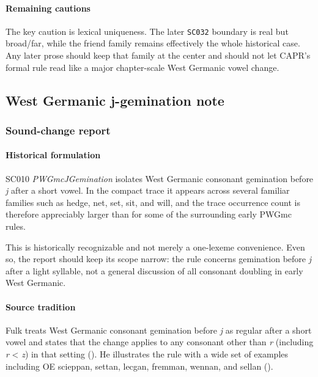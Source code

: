 \documentclass[
  british,
  a4paper,
]{article}
\begin{document}
\paragraph{Remaining cautions}\label{remaining-cautions-6}

The key caution is lexical uniqueness. The later \texttt{SC032} boundary
is real but broad/far, while the friend family remains effectively the
whole historical case. Any later prose should keep that family at the
center and should not let CAPR's formal rule read like a major
chapter-scale West Germanic vowel change.

\subsection{West Germanic j-gemination
note}\label{west-germanic-j-gemination-note}

\subsubsection{Sound-change report}\label{sound-change-report-7}

\paragraph{Historical formulation}\label{historical-formulation-7}

SC010 \emph{PWGmcJGemination} isolates West Germanic consonant
gemination before \emph{j} after a short vowel. In the compact trace it
appears across several familiar families such as hedge, net, set, sit,
and will, and the trace occurrence count is therefore appreciably larger
than for some of the surrounding early PWGmc rules.

This is historically recognizable and not merely a one-lexeme
convenience. Even so, the report should keep its scope narrow: the rule
concerns gemination before \emph{j} after a light syllable, not a
general discussion of all consonant doubling in early West Germanic.

\paragraph{Source tradition}\label{source-tradition-7}

Fulk treats West Germanic consonant gemination before \emph{j} as
regular after a short vowel and states that the change applies to any
consonant other than \emph{r} (including \emph{r} \textless{} \emph{z})
in that setting (). He
illustrates the rule with a wide set of examples including OE scieppan,
settan, lecgan, fremman, wennan, and sellan
().
\end{document}
